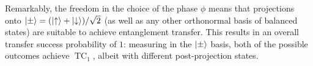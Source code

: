 \documentclass[
	aps, pra,
	superscriptaddress, twocolumn,
	floatfix,
	10pt
]{revtex4-1}
\newcommand{\on}[1]{\operatorname{#1}}
\newcommand{\calC}{{\mathcal{C}}}
\newcommand{\calH}{{\mathcal{H}}}
\newcommand{\calW}{{\mathcal{W}}}
\newcommand{\commale}[1]{{\textcolor{red} {\it{[Note (Ale): #1]}}}}
\begin{document}
Remarkably, the freedom in the choice of the phase $\phi$ means that projections onto $\ket\pm= (\ket\uparrow+\ket\downarrow)/\sqrt2$ (as well as any other orthonormal basis of balanced states) are suitable to achieve entanglement transfer.
This results in an overall transfer success probability of $1$: measuring in the $\ket\pm$ basis, both of the possible outcomes achieve $\on{TC}_1$, albeit with different post-projection states.
\end{document}
